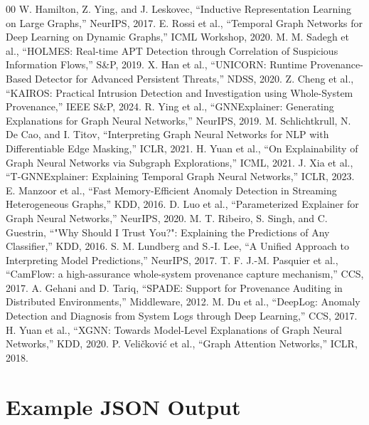 \documentclass[conference]{IEEEtran}
\begin{document}
\begin{thebibliography}{00}
 W. Hamilton, Z. Ying, and J. Leskovec, ``Inductive Representation Learning on Large Graphs,'' NeurIPS, 2017.
 E. Rossi et al., ``Temporal Graph Networks for Deep Learning on Dynamic Graphs,'' ICML Workshop, 2020.
 M. M. Sadegh et al., ``HOLMES: Real-time APT Detection through Correlation of Suspicious Information Flows,'' S\&P, 2019.
 X. Han et al., ``UNICORN: Runtime Provenance-Based Detector for Advanced Persistent Threats,'' NDSS, 2020.
 Z. Cheng et al., ``KAIROS: Practical Intrusion Detection and Investigation using Whole-System Provenance,'' IEEE S\&P, 2024.
 R. Ying et al., ``GNNExplainer: Generating Explanations for Graph Neural Networks,'' NeurIPS, 2019.
 M. Schlichtkrull, N. De Cao, and I. Titov, ``Interpreting Graph Neural Networks for NLP with Differentiable Edge Masking,'' ICLR, 2021.
 H. Yuan et al., ``On Explainability of Graph Neural Networks via Subgraph Explorations,'' ICML, 2021.
 J. Xia et al., ``T-GNNExplainer: Explaining Temporal Graph Neural Networks,'' ICLR, 2023.
 E. Manzoor et al., ``Fast Memory-Efficient Anomaly Detection in Streaming Heterogeneous Graphs,'' KDD, 2016.
 D. Luo et al., ``Parameterized Explainer for Graph Neural Networks,'' NeurIPS, 2020.
 M. T. Ribeiro, S. Singh, and C. Guestrin, ``"Why Should I Trust You?": Explaining the Predictions of Any Classifier,'' KDD, 2016.
 S. M. Lundberg and S.-I. Lee, ``A Unified Approach to Interpreting Model Predictions,'' NeurIPS, 2017.
 T. F. J.-M. Pasquier et al., ``CamFlow: a high-assurance whole-system provenance capture mechanism,'' CCS, 2017.
 A. Gehani and D. Tariq, ``SPADE: Support for Provenance Auditing in Distributed Environments,'' Middleware, 2012.
 M. Du et al., ``DeepLog: Anomaly Detection and Diagnosis from System Logs through Deep Learning,'' CCS, 2017.
 H. Yuan et al., ``XGNN: Towards Model-Level Explanations of Graph Neural Networks,'' KDD, 2020.
 P. Veličković et al., ``Graph Attention Networks,'' ICLR, 2018.
\end{thebibliography}


\appendix
\section{Example JSON Output}
\label{appendix:json}
\end{document}
